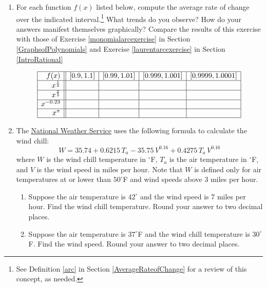 \begin{enumerate}
\setcounter{enumi}{\value{HW}}

\item \label{powerarcexercise}For each function $f(x)$ listed below, compute the average rate of change over the indicated interval.\footnote{See Definition \ref{arc} in Section \ref{AverageRateofChange} for a review of this concept, as needed.}  What trends do you observe?  How do your answers manifest themselves graphically?  Compare the results of this exercise with those of Exercise \ref{monomialarcexercise} in Section \ref{GraphsofPolynomials} and Exercise \ref{laurentarcexercise} in Section \ref{IntroRational}

\[ \begin{array}{|r||c|c|c|c|}  \hline

 f(x) &  [0.9, 1.1] & [0.99, 1.01] &[0.999, 1.001] & [0.9999, 1.0001]  \\ \hline
 x^{\frac{1}{2}} &&&&  \\  \hline
 x^{\frac{2}{3}} &&&&  \\ \hline
 x^{-0.23} &&&&   \\  \hline
 x^{\pi}  &&&&   \\  \hline

\end{array} \]

\item \label{WindChillTemperature} The \href{http://www.nws.noaa.gov/om/windchill/windchillglossary.shtml}{\underline{National Weather Service}} uses the following formula to calculate the wind chill: \[ W = 35.74 + 0.6215 \, T_{a} - 35.75\, V^{0.16} + 0.4275 \, T_{a} \, V^{0.16}  \] where $W$ is the wind chill temperature in $^{\circ}$F, $T_{a}$ is the air temperature in $^{\circ}$F, and  $V$ is the wind speed in miles per hour.  Note that $W$ is defined only for air temperatures at or lower than $50^{\circ}$F and wind speeds above $3$ miles per hour.

\begin{enumerate}

\item  Suppose the air temperature is $42^{\circ}$ and the wind speed is $7$ miles per hour. Find the wind chill temperature.  Round your answer to two decimal places.

\item  Suppose the air temperature is $37^{\circ}$F and the wind chill temperature is $30^{\circ}$F.  Find the wind speed.  Round your answer to two decimal places. 


\end{enumerate}
\end{enumerate}
